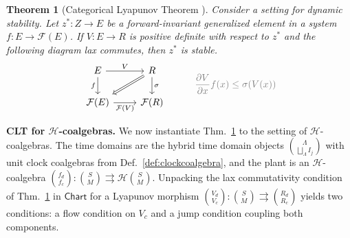 \documentclass[letterpaper, 10 pt, conference]{IEEEconf}
\newcommand{\subsect}[1]{\vspace{0.5em}\noindent\textbf{#1.}}
\newtheorem{thm}{Theorem}
\theoremstyle{definition}
\newcommand{\ex}[1]{
\hspace*{\fill}
\textcolor{gray}{#1}
}
\newcommand{\maps}{\colon}
\newcommand{\chart}{\rightrightarrows}
\newcommand{\namedcat}[1]{\mathsf{#1}}
\newcommand{\Chart}{\namedcat{Chart}}
\newcommand{\functor}[1]{\mathcal{#1}}
\newcommand{\F}{\functor{F}}
\renewcommand{\H}{\functor{H}}
\begin{document}
\begin{thm}[Categorical Lyapunov Theorem \cite{CLT2}]
\label{thm:CLT}
    Consider a setting for dynamic stability. Let $z^* \maps Z \to E$ be a forward-invariant generalized element in a system $f \maps E \to \F(E)$. If $V \maps E \to R$ is positive definite with respect to $z^*$ and the following diagram lax commutes, then $z^*$ is stable. 
    \begin{eqnarray}
    \label{eqn:lyapunov}
    \begin{tikzcd}
        E
        \arrow[r, "V"]
        \arrow[d, "f"']
        &
        R
        \arrow[d, "\sigma"]
        \arrow[dl, Rightarrow]
        \\
        \F(E)
        \arrow[r, "\F(V)"']
        &
        \F(R)
    \end{tikzcd}
    \hspace{1cm} \ex{\frac{\partial V}{\partial x} f(x) \leq \sigma(V(x))}
    \end{eqnarray}
\end{thm}

\subsect{CLT for $\H$-coalgebras}
%
We now instantiate Thm.~\ref{thm:CLT} to the setting of $\H$-coalgebras. The time domains are the hybrid time domain objects $\binom{\Lambda}{\bigsqcup_\Lambda I_j}$ with unit clock coalgebras from Def.~\ref{def:clockcoalgebra}, and the plant is an $\H$-coalgebra $\binom{f_d}{f_c} \maps \binom{S}{M} \chart \H\binom{S}{M}$. Unpacking the lax commutativity condition of Thm.~\ref{thm:CLT} in $\Chart$ for a Lyapunov morphism $\binom{V_d}{V_c} \maps \binom{S}{M} \chart \binom{R_d}{R_c}$ yields two conditions: a flow condition on $V_c$ and a jump condition coupling both components.
\end{document}
